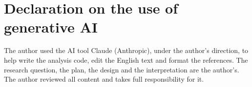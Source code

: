 \documentclass[10pt,a4paper,twocolumn]{article}
\begin{document}
\section*{Declaration on the use of generative AI}
The author used the AI tool Claude (Anthropic), under the author's direction, to help
write the analysis code, edit the English text and format the references. The research
question, the plan, the design and the interpretation are the author's. The author
reviewed all content and takes full responsibility for it.

{\renewcommand{\href}[2]{\url{#1}}

}
\end{document}
